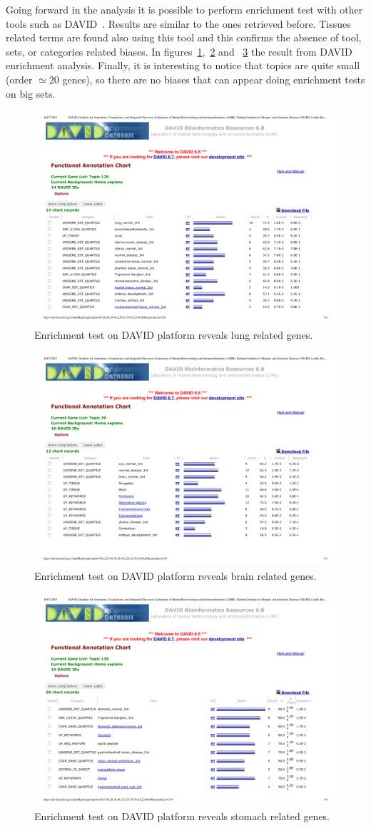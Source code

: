 Going forward in the analysis it is possible to perform enrichment test with other tools such as DAVID~\cite{huang2008bioinformatics,huang2009systematic}. Results are similar to the ones retrieved before. Tissues related terms are found also using this tool and this confirms the absence of tool, sets, or categories related biases. In figures~\ref{fig:topic/merged/DAVID_lung},~\ref{fig:topic/merged/DAVID_brain} and ~\ref{fig:topic/merged/DAVID_stomach} the result from DAVID enrichment analysis. Finally, it is interesting to notice that topics are quite small (order $\simeq20$ genes), so there are no biases that can appear doing enrichment tests on big sets.
\begin{figure}[htb!]
    \centering
    \includegraphics[width=0.6\linewidth]{pictures/topic/merged/DAVID_lung.pdf}
    \caption{Enrichment test on DAVID platform reveals lung related genes.}
    \label{fig:topic/merged/DAVID_lung}
\end{figure}
\begin{figure}[htb!]
    \centering
    \includegraphics[width=0.6\linewidth]{pictures/topic/merged/DAVID_brain.pdf}
    \caption{Enrichment test on DAVID platform reveals brain related genes.}
    \label{fig:topic/merged/DAVID_brain}
\end{figure}
\begin{figure}[htb!]
    \centering
    \includegraphics[width=0.6\linewidth]{pictures/topic/merged/DAVID_stomach.pdf}
    \caption{Enrichment test on DAVID platform reveals stomach related genes.}
    \label{fig:topic/merged/DAVID_stomach}
\end{figure}

